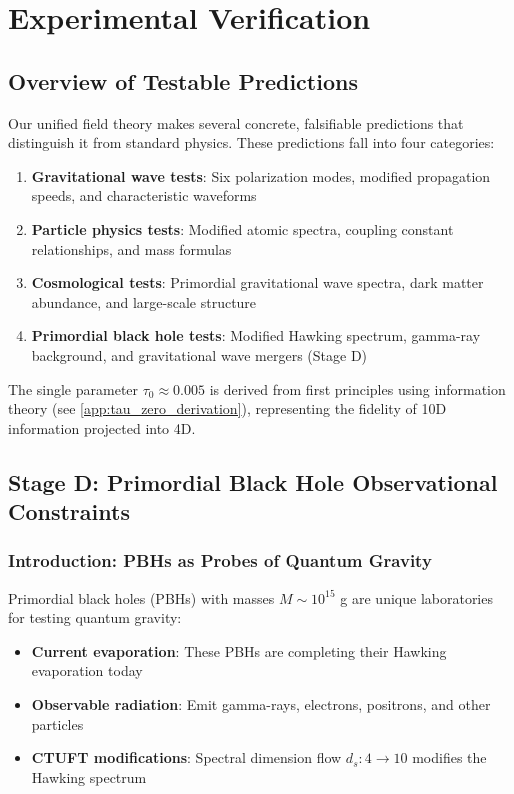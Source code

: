 \section{Experimental Verification}
\label{sec:experimental}

\subsection{Overview of Testable Predictions}

Our unified field theory makes several concrete, falsifiable predictions that distinguish it from standard physics. These predictions fall into four categories:

\begin{enumerate}
    \item \textbf{Gravitational wave tests}: Six polarization modes, modified propagation speeds, and characteristic waveforms
    \item \textbf{Particle physics tests}: Modified atomic spectra, coupling constant relationships, and mass formulas
    \item \textbf{Cosmological tests}: Primordial gravitational wave spectra, dark matter abundance, and large-scale structure
    \item \textbf{Primordial black hole tests}: Modified Hawking spectrum, gamma-ray background, and gravitational wave mergers (Stage D)
\end{enumerate}

The single parameter $\tau_0 \approx 0.005$ is derived from first principles using information theory (see \cref{app:tau_zero_derivation}), representing the fidelity of 10D information projected into 4D.

\subsection{Stage D: Primordial Black Hole Observational Constraints}
\label{subsec:stageD_observations}

\subsubsection{Introduction: PBHs as Probes of Quantum Gravity}

Primordial black holes (PBHs) with masses $M \sim 10^{15}$ g are unique laboratories for testing quantum gravity:
\begin{itemize}
    \item \textbf{Current evaporation}: These PBHs are completing their Hawking evaporation today
    \item \textbf{Observable radiation}: Emit gamma-rays, electrons, positrons, and other particles
    \item \textbf{CTUFT modifications}: Spectral dimension flow $d_s: 4 \to 10$ modifies the Hawking spectrum
\end{itemize}

